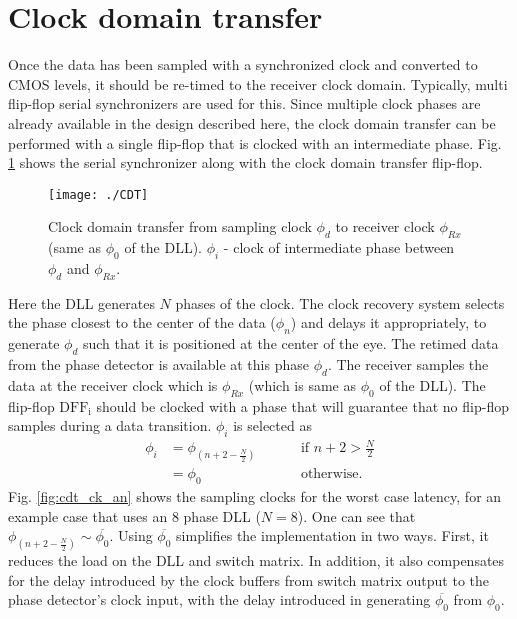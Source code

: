 \documentclass[journal,twoside,letterpaper]{IEEEtran}
\begin{document}
\section{Clock domain transfer}
\label{sec:cdt}
Once the data has been sampled with a synchronized clock
and converted to CMOS levels, it should be re-timed
to the receiver clock domain.
Typically, multi flip-flop serial synchronizers are used for this. 
Since multiple clock phases are already available in the design described here,
the clock domain transfer can be performed with a single flip-flop
that is clocked with an intermediate phase.
Fig. \ref{fig:CDT} shows the serial synchronizer along with the 
clock domain transfer flip-flop.
\begin{figure}[h!]

\centering
\texttt{[image: ./CDT]}
\caption{Clock domain transfer from sampling clock $\phi_d$ 
to receiver clock $\phi_{Rx}$ (same as $\phi_0$ of the DLL). 
$\phi _i$ - clock of 
intermediate phase between $\phi_d$ and $\phi_{Rx}$.}
\label{fig:CDT}
\end{figure}
Here the DLL generates
$N$ phases of the clock. The clock recovery system
selects the phase closest to the center of the data
($\phi_n$) and delays it appropriately, to generate
$\phi_d$ such that it
is positioned at the center of the eye. The retimed
data from the phase detector is available at this
phase $\phi_d$. The receiver
samples the data at the receiver clock which is
$\phi_{Rx}$ (which is same as $\phi_0$ of the DLL). 
The flip-flop $\text{DFF}_{\text{i}}$ should be clocked
with a phase that will guarantee that no flip-flop
samples during a data transition. $\phi _i$ is
selected as
\begin{align*}
\phi _i &= \phi _{(n+2 - \frac{N}{2})} \hspace{1cm} &\mbox{if } n+2 > \frac{N}{2}
\\
        &= \phi _0 \hspace{1cm} &\mbox{otherwise.} 
\end{align*}
Fig. \ref{fig:cdt_ck_an}
shows the sampling clocks for the worst case latency, for an example
case that uses an 8 phase DLL ($N=8$).
One can see that $\phi _{(n+2 - \frac{N}{2})} \sim \overline{\phi _0}$.
Using $\overline{\phi _0}$ simplifies the implementation in two ways.
First, it reduces the load on the DLL and switch matrix. In addition, it also 
compensates for the delay introduced by the clock buffers from switch 
matrix output to the phase detector's clock input, with the delay 
introduced in generating $\overline{\phi _0}$ from $\phi _0$. 
\end{document}
